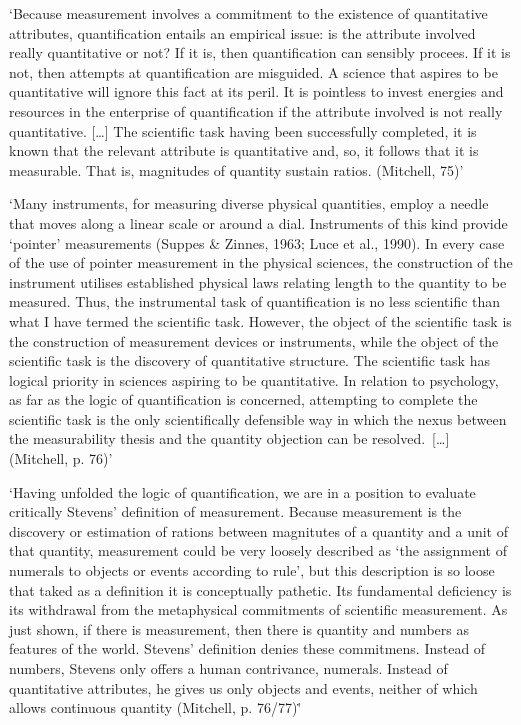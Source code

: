 \documentclass[utf8]{FrontiersinVancouver}
\begin{document}
    `Because measurement involves a commitment to the existence of quantitative attributes, quantification entails an empirical issue: is the attribute involved really quantitative or not? If it is, then quantification can sensibly procees. If it is not, then attempts at quantification are misguided. A science that aspires to be quantitative will ignore this fact at its peril. It is pointless to invest energies and resources in the enterprise of quantification if the attribute involved is not really quantitative. [\ldots] The scientific task having been successfully completed, it is known that the relevant attribute is quantitative and, so, it follows that it is measurable. That is, magnitudes of quantity sustain ratios. (Mitchell, 75)'

    `Many instruments, for measuring diverse physical quantities, employ a needle that moves along a linear scale or around a dial. Instruments of this kind provide `pointer' measurements (Suppes \& Zinnes, 1963; Luce et al., 1990). In every case of the use of pointer measurement in the physical sciences, the construction of the instrument utilises established physical laws relating length to the quantity to be measured. Thus, the instrumental task of quantification is no less scientific than what I have termed the scientific task. However, the object of the scientific task is the construction of measurement devices or instruments, while the object of the scientific task is the discovery of quantitative structure. The scientific task has logical priority in sciences aspiring to be quantitative. In relation to psychology, as far as the logic of quantification is concerned, attempting to complete the scientific task is the only scientifically defensible way in which the nexus between the measurability thesis and the quantity objection can be resolved.\ [\ldots] (Mitchell, p. 76)'

    `Having unfolded the logic of quantification, we are in a position to evaluate critically Stevens' definition of measurement. Because measurement is the discovery or estimation of rations between magnitutes of a quantity and a unit of that quantity, measurement could be very loosely described as `the assignment of numerals to objects or events according to rule', but this description is so loose that taked as a definition it is conceptually pathetic. Its fundamental deficiency is its withdrawal from the metaphysical commitments of scientific measurement. As just shown, if there is measurement, then there is quantity and numbers as features of the world. Stevens' definition denies these commitmens. Instead of numbers, Stevens only offers a human contrivance, numerals. Instead of quantitative attributes, he gives us only objects and events, neither of which allows continuous quantity (Mitchell, p. 76/77)\.'
\end{document}
